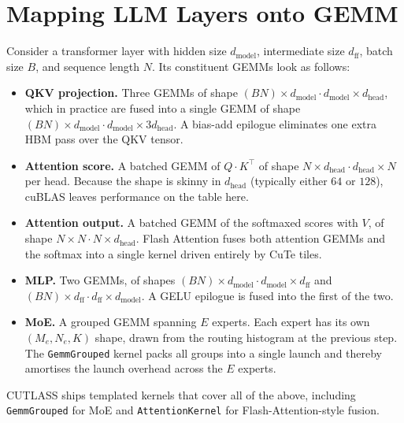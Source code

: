 \section{Mapping LLM Layers onto GEMM}\label{sec:cutlass_llm}
Consider a transformer layer with hidden size $d_{\text{model}}$,
intermediate size $d_{\text{ff}}$, batch size $B$, and sequence
length $N$. Its constituent GEMMs look as follows:
\begin{itemize}
    \item \textbf{QKV projection.} Three GEMMs of shape
          $(BN) \times d_{\text{model}} \cdot d_{\text{model}}
          \times d_{\text{head}}$, which in practice are fused into
          a single GEMM of shape
          $(BN) \times d_{\text{model}} \cdot d_{\text{model}}
          \times 3d_{\text{head}}$. A bias-add epilogue eliminates
          one extra HBM pass over the QKV tensor.
    \item \textbf{Attention score.} A batched GEMM of
          $Q \cdot K^{\!\top}$ of shape
          $N \times d_{\text{head}} \cdot d_{\text{head}}
          \times N$ per head. Because the shape is skinny in
          $d_{\text{head}}$ (typically either $64$ or $128$),
          cuBLAS leaves performance on the table here.
    \item \textbf{Attention output.} A batched GEMM of the
          softmaxed scores with $V$, of shape
          $N \times N \cdot N \times d_{\text{head}}$. Flash
          Attention fuses both attention GEMMs and the softmax into
          a single kernel driven entirely by CuTe tiles.
    \item \textbf{MLP.} Two GEMMs, of shapes
          $(BN) \times d_{\text{model}} \cdot d_{\text{model}}
          \times d_{\text{ff}}$
          and
          $(BN) \times d_{\text{ff}} \cdot d_{\text{ff}}
          \times d_{\text{model}}$. A GELU epilogue is fused into
          the first of the two.
    \item \textbf{MoE.} A grouped GEMM spanning $E$ experts. Each
          expert has its own $(M_e, N_e, K)$ shape, drawn from the
          routing histogram at the previous step. The
          \texttt{GemmGrouped} kernel packs all groups into a
          single launch and thereby amortises the launch overhead
          across the $E$ experts.
\end{itemize}
CUTLASS ships templated kernels that cover all of the above,
including \texttt{GemmGrouped} for MoE and
\texttt{AttentionKernel} for Flash-Attention-style fusion.

